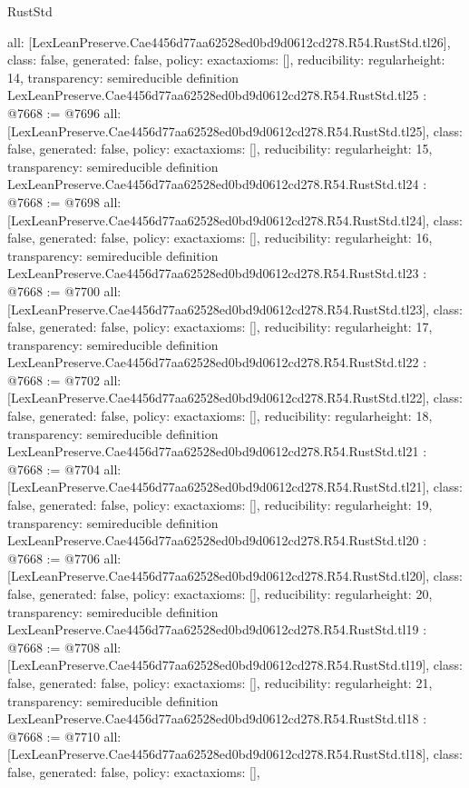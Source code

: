 \begin{lexlean}{RustStd}
\begin{coremodule}
{  all: [LexLeanPreserve.Cae4456d77aa62528ed0bd9d0612cd278.R54.RustStd.tl26],
  class: false,
  generated: false,
  policy: exact{axioms: []},
  reducibility: regular{height: 14},
  transparency: semireducible
}
definition LexLeanPreserve.Cae4456d77aa62528ed0bd9d0612cd278.R54.RustStd.tl25 : @7668 := @7696 {
  all: [LexLeanPreserve.Cae4456d77aa62528ed0bd9d0612cd278.R54.RustStd.tl25],
  class: false,
  generated: false,
  policy: exact{axioms: []},
  reducibility: regular{height: 15},
  transparency: semireducible
}
definition LexLeanPreserve.Cae4456d77aa62528ed0bd9d0612cd278.R54.RustStd.tl24 : @7668 := @7698 {
  all: [LexLeanPreserve.Cae4456d77aa62528ed0bd9d0612cd278.R54.RustStd.tl24],
  class: false,
  generated: false,
  policy: exact{axioms: []},
  reducibility: regular{height: 16},
  transparency: semireducible
}
definition LexLeanPreserve.Cae4456d77aa62528ed0bd9d0612cd278.R54.RustStd.tl23 : @7668 := @7700 {
  all: [LexLeanPreserve.Cae4456d77aa62528ed0bd9d0612cd278.R54.RustStd.tl23],
  class: false,
  generated: false,
  policy: exact{axioms: []},
  reducibility: regular{height: 17},
  transparency: semireducible
}
definition LexLeanPreserve.Cae4456d77aa62528ed0bd9d0612cd278.R54.RustStd.tl22 : @7668 := @7702 {
  all: [LexLeanPreserve.Cae4456d77aa62528ed0bd9d0612cd278.R54.RustStd.tl22],
  class: false,
  generated: false,
  policy: exact{axioms: []},
  reducibility: regular{height: 18},
  transparency: semireducible
}
definition LexLeanPreserve.Cae4456d77aa62528ed0bd9d0612cd278.R54.RustStd.tl21 : @7668 := @7704 {
  all: [LexLeanPreserve.Cae4456d77aa62528ed0bd9d0612cd278.R54.RustStd.tl21],
  class: false,
  generated: false,
  policy: exact{axioms: []},
  reducibility: regular{height: 19},
  transparency: semireducible
}
definition LexLeanPreserve.Cae4456d77aa62528ed0bd9d0612cd278.R54.RustStd.tl20 : @7668 := @7706 {
  all: [LexLeanPreserve.Cae4456d77aa62528ed0bd9d0612cd278.R54.RustStd.tl20],
  class: false,
  generated: false,
  policy: exact{axioms: []},
  reducibility: regular{height: 20},
  transparency: semireducible
}
definition LexLeanPreserve.Cae4456d77aa62528ed0bd9d0612cd278.R54.RustStd.tl19 : @7668 := @7708 {
  all: [LexLeanPreserve.Cae4456d77aa62528ed0bd9d0612cd278.R54.RustStd.tl19],
  class: false,
  generated: false,
  policy: exact{axioms: []},
  reducibility: regular{height: 21},
  transparency: semireducible
}
definition LexLeanPreserve.Cae4456d77aa62528ed0bd9d0612cd278.R54.RustStd.tl18 : @7668 := @7710 {
  all: [LexLeanPreserve.Cae4456d77aa62528ed0bd9d0612cd278.R54.RustStd.tl18],
  class: false,
  generated: false,
  policy: exact{axioms: []},
}
\end{coremodule}
\end{lexlean}
